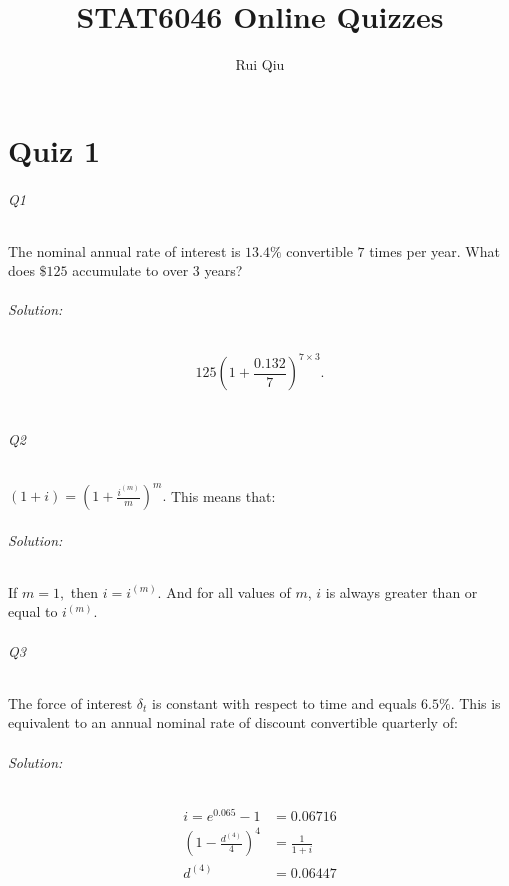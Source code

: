 \documentclass[a4paper, 11pt, twoside]{article}
\begin{document}
\title{STAT6046 Online Quizzes}
\author{Rui Qiu}

\maketitle

\part{Quiz 1}

\paragraph{Q1} The nominal annual rate of interest is $13.4\%$ convertible $7$ times per year. What does $\$125$ accumulate to over $3$ years?\\

\paragraph{Solution:} \[125\left(1+\frac{0.132}{7}\right)^{7\times 3}.\]\\

\paragraph{Q2} $(1+i)=(1+\frac{i^{(m)}}{m})^m.$ This means that:\\

\paragraph{Solution:} If $m=1,$ then $i=i^{(m)}.$ And for all values of $m$, $i$ is always greater than or equal to $i^{(m)}.$\\

\paragraph{Q3} The force of interest $\delta_t$ is constant with respect to time and equals $6.5\%$. This is equivalent to an annual nominal rate of discount convertible quarterly of:\\

\paragraph{Solution:}

\[
\begin{split}
	i = e^{0.065}-1 &= 0.06716\\
	\left(1-\frac{d^{(4)}}{4}\right)^4 &= \frac1{1+i}\\
	d^{(4)} &= 0.06447\\
\end{split}
\]
\end{document}
